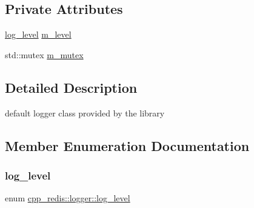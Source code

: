 \subsection*{Private Attributes}
\begin{DoxyCompactItemize}
\item 
\hyperlink{classcpp__redis_1_1logger_a9493594d547e7abe71b8690be1946c7a}{log\+\_\+level} \hyperlink{classcpp__redis_1_1logger_af9f41a47abdc48c69cf35a41c14f7a52}{m\+\_\+level}
\item 
std\+::mutex \hyperlink{classcpp__redis_1_1logger_a74810c30886b21bde6590c0d21234c05}{m\+\_\+mutex}
\end{DoxyCompactItemize}


\subsection{Detailed Description}
default logger class provided by the library 

\subsection{Member Enumeration Documentation}
\mbox{\label{classcpp__redis_1_1logger_a9493594d547e7abe71b8690be1946c7a}} 
\subsubsection{\texorpdfstring{log\+\_\+level}{log\_level}}
{\footnotesize\ttfamily enum \hyperlink{classcpp__redis_1_1logger_a9493594d547e7abe71b8690be1946c7a}{cpp\+\_\+redis\+::logger\+::log\+\_\+level}\hspace{0.3cm}{\ttfamily [strong]}}

